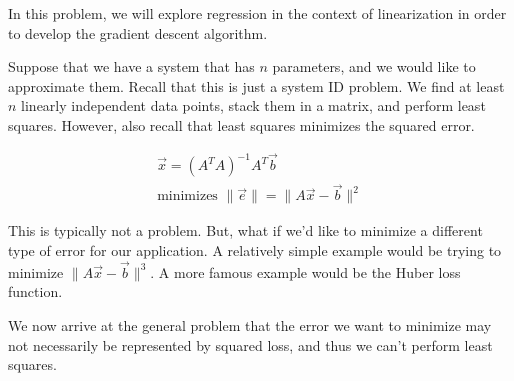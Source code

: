 

In this problem, we will explore regression in the context of linearization in order to develop the gradient descent algorithm.

Suppose that we have a system that has $n$ parameters, and we would like to approximate them.
Recall that this is just a system ID problem. We find at least $n$ linearly independent data points, stack them in a matrix, and perform least squares. However, also recall that least squares minimizes the squared error.

\begin{align*}
\vec{x} = (A^{T}A)^{-1}A^{T}\vec{b} \\
\text{minimizes } \lVert \vec{e} \rVert = \lVert A\vec{x} - \vec{b} \rVert ^{2}
\end{align*}

This is typically not a problem. But, what if we'd like to minimize a different type of error for our application.
A relatively simple example would be trying to minimize $\lVert A\vec{x} - \vec{b} \rVert ^{3}$.
A more famous example would be the Huber loss function.

We now arrive at the general problem that the error we want to minimize may not necessarily be represented by squared loss, and thus we can't perform least squares.

